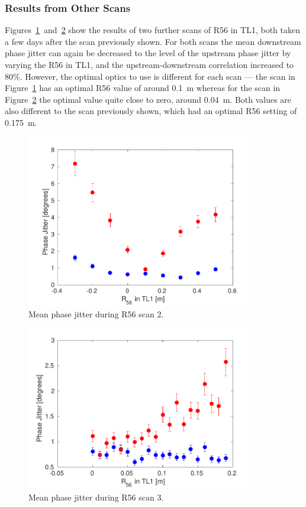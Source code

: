 \subsubsection{Results from Other Scans}

Figures~\ref{f:r56Scan2_meanJitter}~and~\ref{f:r56Scan3_meanJitter} show the results of two further scans of R56 in TL1, both taken a few days after the scan previously shown. For both scans the mean downstream phase jitter can again be decreased to the level of the upstream phase jitter by varying the R56 in TL1, and the upstream-downstream correlation increased to 80\%. However, the optimal optics to use is different for each scan --- the scan in Figure~\ref{f:r56Scan2_meanJitter} has an optimal R56 value of around 0.1~m whereas for the scan in Figure~\ref{f:r56Scan3_meanJitter} the optimal value quite close to zero, around 0.04~m. Both values are also different to the scan previously shown, which had an optimal R56 setting of 0.175~m.

\begin{figure}
  \centering
  \includegraphics[width=0.9\textwidth]{Figures/propagation/r56Scan2_meanJitter}
  \caption{Mean phase jitter during R56 scan 2.}
  \label{f:r56Scan2_meanJitter}
\end{figure}

\begin{figure}
  \centering
  \includegraphics[width=0.9\textwidth]{Figures/propagation/r56Scan3_meanJitter}
  \caption{Mean phase jitter during R56 scan 3.}
  \label{f:r56Scan3_meanJitter}
\end{figure}

